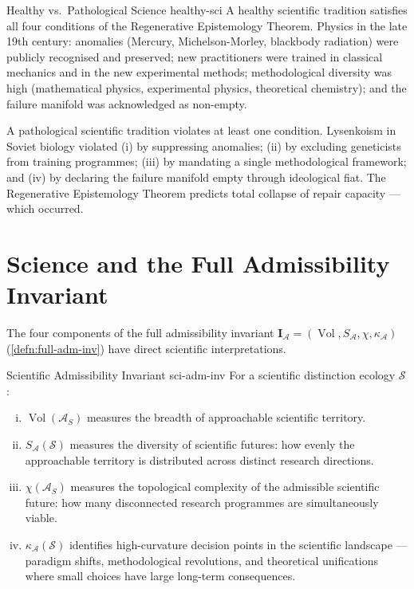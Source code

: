 \documentclass[12pt,twoside,openright]{book}
\newcommand{\adm}{\mathcal{A}}
\newcommand{\Vol}{\operatorname{Vol}}
\begin{document}
\begin{example}{Healthy vs.\ Pathological Science}%
  {healthy-sci}
  A healthy scientific tradition satisfies all four
  conditions of the Regenerative Epistemology Theorem.
  Physics in the late 19th century: anomalies (Mercury,
  Michelson-Morley, blackbody radiation) were
  publicly recognised and preserved; new practitioners
  were trained in classical mechanics and in the new
  experimental methods; methodological diversity was
  high (mathematical physics, experimental physics,
  theoretical chemistry); and the failure manifold
  was acknowledged as non-empty.

  A pathological scientific tradition violates at
  least one condition. Lysenkoism in Soviet biology
  violated (i) by suppressing anomalies; (ii) by
  excluding geneticists from training programmes;
  (iii) by mandating a single methodological framework;
  and (iv) by declaring the failure manifold empty
  through ideological fiat.
  The Regenerative Epistemology Theorem predicts
  total collapse of repair capacity — which occurred.
\end{example}

\section{Science and the Full Admissibility Invariant}

The four components of the full admissibility invariant
$\mathbf{I}_\adm = (\Vol, S_\adm, \chi, \kappa_\adm)$
(\cref{defn:full-adm-inv}) have direct scientific
interpretations.

\begin{proposition}{Scientific Admissibility Invariant}%
  {sci-adm-inv}
  For a scientific distinction ecology $\mathcal{S}$:
  \begin{enumerate}[(i)]
    \item $\Vol(\adm_S)$ measures the breadth of
          approachable scientific territory.
    \item $S_\adm(\mathcal{S})$ measures the diversity
          of scientific futures: how evenly the
          approachable territory is distributed across
          distinct research directions.
    \item $\chi(\adm_S)$ measures the topological
          complexity of the admissible scientific future:
          how many disconnected research programmes
          are simultaneously viable.
    \item $\kappa_\adm(\mathcal{S})$ identifies
          high-curvature decision points in the
          scientific landscape — paradigm shifts,
          methodological revolutions, and theoretical
          unifications where small choices have
          large long-term consequences.
  \end{enumerate}
\end{proposition}
\end{document}
